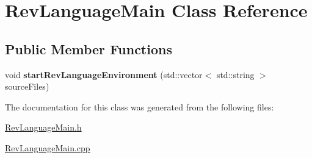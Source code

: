 \hypertarget{class_rev_language_main}{
\section{RevLanguageMain Class Reference}
\label{class_rev_language_main}
}
\subsection*{Public Member Functions}
\begin{DoxyCompactItemize}
\item 
\hypertarget{class_rev_language_main_a10b7ad16d5de5035f119a74ce7dd0861}{
void {\bfseries startRevLanguageEnvironment} (std::vector$<$ std::string $>$ sourceFiles)}
\label{class_rev_language_main_a10b7ad16d5de5035f119a74ce7dd0861}

\end{DoxyCompactItemize}


The documentation for this class was generated from the following files:\begin{DoxyCompactItemize}
\item 
\hyperlink{_rev_language_main_8h}{RevLanguageMain.h}\item 
\hyperlink{_rev_language_main_8cpp}{RevLanguageMain.cpp}\end{DoxyCompactItemize}
